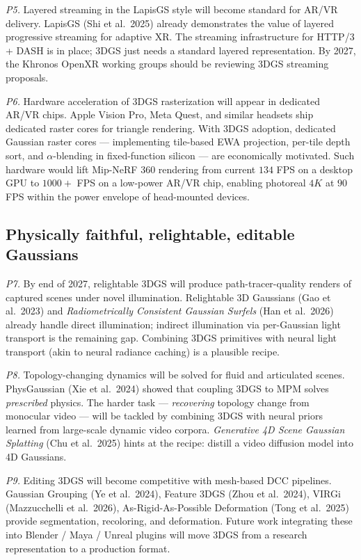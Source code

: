 \documentclass{article}
\begin{document}
\emph{P5.} Layered streaming in the LapisGS style will become standard for AR/VR delivery. LapisGS (Shi et al.~2025) already demonstrates the value of layered progressive streaming for adaptive XR. The streaming infrastructure for HTTP/3 + DASH is in place; 3DGS just needs a standard layered representation. By 2027, the Khronos OpenXR working groups should be reviewing 3DGS streaming proposals.

\emph{P6.} Hardware acceleration of 3DGS rasterization will appear in dedicated AR/VR chips. Apple Vision Pro, Meta Quest, and similar headsets ship dedicated raster cores for triangle rendering. With 3DGS adoption, dedicated Gaussian raster cores --- implementing tile-based EWA projection, per-tile depth sort, and \(\alpha\)-blending in fixed-function silicon --- are economically motivated. Such hardware would lift Mip-NeRF 360 rendering from current \(134\) FPS on a desktop GPU to \(1000+\) FPS on a low-power AR/VR chip, enabling photoreal \(4K\) at \(90\) FPS within the power envelope of head-mounted devices.

\subsection{Physically faithful, relightable, editable Gaussians}\label{physically-faithful-relightable-editable-gaussians}

\emph{P7.} By end of 2027, relightable 3DGS will produce path-tracer-quality renders of captured scenes under novel illumination. Relightable 3D Gaussians (Gao et al.~2023) and \emph{Radiometrically Consistent Gaussian Surfels} (Han et al.~2026) already handle direct illumination; indirect illumination via per-Gaussian light transport is the remaining gap. Combining 3DGS primitives with neural light transport (akin to neural radiance caching) is a plausible recipe.

\emph{P8.} Topology-changing dynamics will be solved for fluid and articulated scenes. PhysGaussian (Xie et al.~2024) showed that coupling 3DGS to MPM solves \emph{prescribed} physics. The harder task --- \emph{recovering} topology change from monocular video --- will be tackled by combining 3DGS with neural priors learned from large-scale dynamic video corpora. \emph{Generative 4D Scene Gaussian Splatting} (Chu et al.~2025) hints at the recipe: distill a video diffusion model into 4D Gaussians.

\emph{P9.} Editing 3DGS will become competitive with mesh-based DCC pipelines. Gaussian Grouping (Ye et al.~2024), Feature 3DGS (Zhou et al.~2024), VIRGi (Mazzucchelli et al.~2026), As-Rigid-As-Possible Deformation (Tong et al.~2025) provide segmentation, recoloring, and deformation. Future work integrating these into Blender / Maya / Unreal plugins will move 3DGS from a research representation to a production format.
\end{document}
